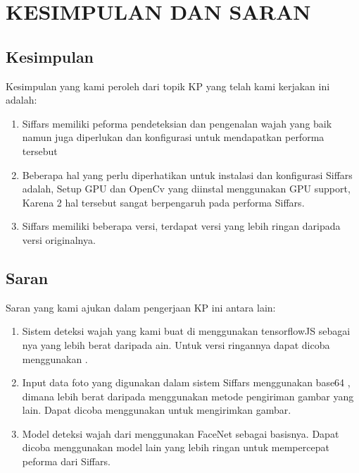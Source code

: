 \chapter{KESIMPULAN DAN SARAN}


\section{Kesimpulan}

Kesimpulan yang kami peroleh dari topik KP yang telah kami kerjakan ini adalah:

\begin{enumerate}[nolistsep]

  \item Siffars memiliki peforma pendeteksian dan pengenalan wajah yang baik namun juga diperlukan  dan konfigurasi untuk mendapatkan performa tersebut

  \item Beberapa hal yang perlu diperhatikan untuk instalasi dan konfigurasi Siffars adalah, Setup GPU dan OpenCv yang diinstal menggunakan GPU support, Karena 2 hal tersebut sangat berpengaruh pada performa Siffars.

  \item Siffars memiliki beberapa versi, terdapat versi  yang lebih ringan daripada versi originalnya.

\end{enumerate}

\section{Saran}

Saran yang kami ajukan dalam pengerjaan KP ini antara lain:

\begin{enumerate}[nolistsep]

  \item Sistem deteksi wajah yang kami buat di  menggunakan tensorflowJS sebagai nya yang lebih berat daripada ain. Untuk versi ringannya dapat dicoba menggunakan .

  \item Input data foto yang digunakan dalam sistem Siffars menggunakan base64 , dimana lebih berat daripada menggunakan metode pengiriman gambar yang lain. Dapat dicoba menggunakan  untuk mengirimkan gambar.

  \item Model deteksi wajah dari  menggunakan FaceNet sebagai basisnya. Dapat dicoba menggunakan model lain yang lebih ringan untuk mempercepat peforma dari Siffars.

\end{enumerate}
